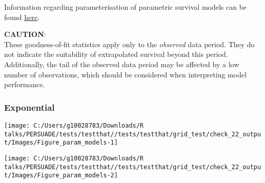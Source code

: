 \documentclass[
]{article}
\begin{document}
Information regarding parameterisation of parametric survival models can
be found
\href{https://devinincerti.com/code/survival-distributions.html}{here}.

\textbf{CAUTION}:\\
These goodness-of-fit statistics apply only to the \emph{observed} data
period. They do not indicate the suitability of extrapolated survival
beyond this period. Additionally, the tail of the observed data period
may be affected by a low number of observations, which should be
considered when interpreting model performance.

\clearpage

\begin{table}[H]
\centering
\caption{\label{tab:Table_2}Goodness of fit statistics}
\centering
{}
\end{table}

\clearpage

\clearpage

\subsubsection{Exponential}\label{exponential}

\begin{flushleft}\texttt{[image: C:/Users/g10028783/Downloads/R talks/PERSUADE/tests/testthat//tests/testthat/grid\_test/check\_22\_output/Images/Figure\_param\_models-1]} \end{flushleft}

\begin{flushleft}\texttt{[image: C:/Users/g10028783/Downloads/R talks/PERSUADE/tests/testthat//tests/testthat/grid\_test/check\_22\_output/Images/Figure\_param\_models-2]} \end{flushleft}
\end{document}
